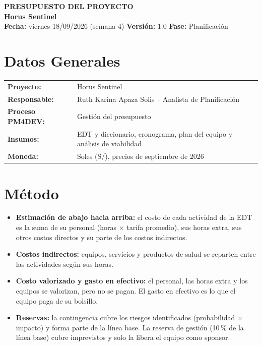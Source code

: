 \documentclass[11pt,a4paper]{article}
\begin{document}
\begin{center}
    {\Large \textbf{\textcolor{AzulUNA}{PRESUPUESTO DEL PROYECTO}}}\\[3pt]
    {\normalsize \textbf{Horus Sentinel}}\\[4pt]
    \footnotesize \textbf{Fecha:} viernes 18/09/2026 (semana 4) \quad \textbar\quad \textbf{Versión:} 1.0 \quad \textbar\quad \textbf{Fase:} Planificación
\end{center}

\vspace{0.1cm}

\section{Datos Generales}
\noindent\begin{tabularx}{\textwidth}{@{}P{4.2cm} L@{}}
\toprule
\textbf{Proyecto:} & Horus Sentinel \\
\textbf{Responsable:} & Ruth Karina Apaza Solis -- Analista de Planificación \\
\textbf{Proceso PM4DEV:} & Gestión del presupuesto \\
\textbf{Insumos:} & EDT y diccionario, cronograma, plan del equipo y análisis de viabilidad \\
\textbf{Moneda:} & Soles (S/), precios de septiembre de 2026 \\
\bottomrule
\end{tabularx}

\section{Método}
\begin{itemize}[leftmargin=*]
    \item \textbf{Estimación de abajo hacia arriba:} el costo de cada actividad de la EDT es la suma de su personal (horas $\times$ tarifa promedio), sus horas extra, sus otros costos directos y su parte de los costos indirectos.
    \item \textbf{Costos indirectos:} equipos, servicios y productos de salud se reparten entre las actividades según sus horas.
    \item \textbf{Costo valorizado y gasto en efectivo:} el personal, las horas extra y los equipos se valorizan, pero no se pagan. El gasto en efectivo es lo que el equipo paga de su bolsillo.
    \item \textbf{Reservas:} la contingencia cubre los riesgos identificados (probabilidad $\times$ impacto) y forma parte de la línea base. La reserva de gestión (10\,\% de la línea base) cubre imprevistos y solo la libera el equipo como sponsor.
\end{itemize}
\end{document}
